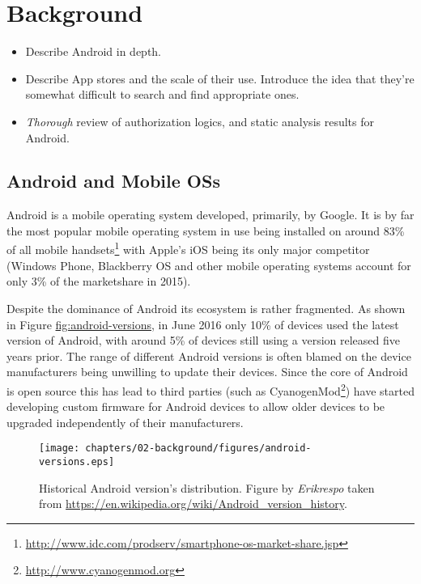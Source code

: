 \documentclass[thesis.tex]{subfiles}
\begin{document}
\chapter{Background}

\begin{todo}
  \begin{itemize}
  \item Describe Android in depth.
  \item Describe App stores and the scale of their use.  Introduce
    the idea that they're somewhat difficult to search and find appropriate
    ones.
  \item \emph{Thorough} review of authorization logics, and static analysis
    results for Android.
  \end{itemize}
\end{todo}

\section{Android and Mobile OSs}\label{android}

Android is a mobile operating system developed, primarily, by Google. It
is by far the most popular mobile operating system in use being
installed on around 83\% of all mobile handsets\footnote{\url{http://www.idc.com/prodserv/smartphone-os-market-share.jsp}}
with Apple's iOS being its only major competitor (Windows Phone,
Blackberry OS and other mobile operating systems account for only 3\% of
the marketshare in 2015).

Despite the dominance of Android its ecosystem is rather fragmented. As
shown in Figure \url{fig:android-versions}, in June 2016 only 10\% of
devices used the latest version of Android, with around 5\% of devices
still using a version released five years prior. The range of different
Android versions is often blamed on the device manufacturers being
unwilling to update their devices. Since the core of Android is open
source this has lead to third parties (such as CyanogenMod\footnote{\url{http://www.cyanogenmod.org}})
have started developing custom firmware for Android devices to allow
older devices to be upgraded independently of their manufacturers.

\begin{figure*}[htbp]
\centering
\texttt{[image: chapters/02-background/figures/android-versions.eps]}
\caption[Historical Android version's distribution.]{Historical Android version's distribution. Figure by \emph{Erikrespo} taken from \url{https://en.wikipedia.org/wiki/Android_version_history}.}
\end{figure*}
\end{document}
